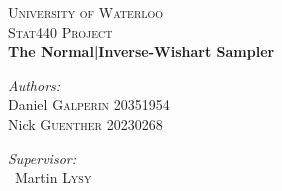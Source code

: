 \documentclass[english]{report}
\begin{document}
\begin{titlepage}
\begin{center}


\textsc{\LARGE University of Waterloo}\\[1.5cm]

\textsc{\Large Stat440 Project}\\[0.5cm]

{ \huge \bfseries The Normal|Inverse-Wishart Sampler \\[0.4cm] }


\begin{minipage}{0.4\textwidth}
\begin{flushleft} \large
\emph{Authors:}\\
Daniel \textsc{Galperin} 20351954\\
Nick \textsc{Guenther} 20230268
\end{flushleft}
\end{minipage}
\begin{minipage}{0.4\textwidth}
\begin{flushright} \large
\emph{Supervisor:} \\
~Martin \textsc{Lysy}
\end{flushright}
\end{minipage}


\end{center}
\end{titlepage}






\newpage

\tableofcontents %
\end{document}
